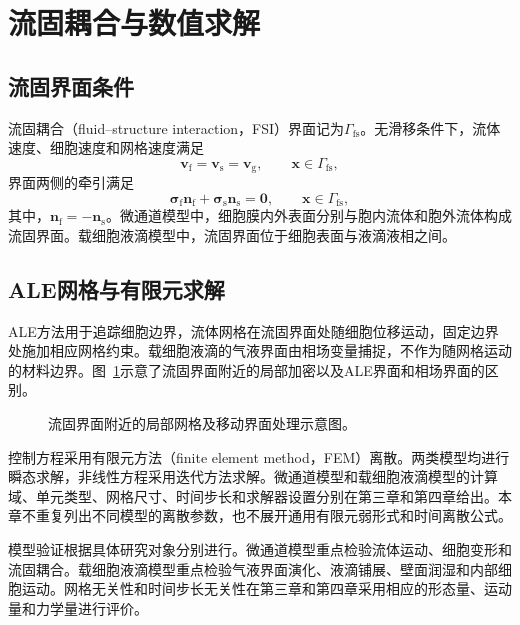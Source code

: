 \section{流固耦合与数值求解}

\subsection{流固界面条件}

流固耦合（fluid--structure interaction，FSI）界面记为$\Gamma_{\mathrm{fs}}$。无滑移条件下，流体速度、细胞速度和网格速度满足
\begin{equation}
\boldsymbol{v}_{\mathrm f}
=
\boldsymbol{v}_{\mathrm s}
=
\boldsymbol{v}_{\mathrm g},
\qquad
\boldsymbol{x}\in\Gamma_{\mathrm{fs}},
\label{eq:ch2_fsi_kinematic}
\end{equation}
界面两侧的牵引满足
\begin{equation}
\boldsymbol{\sigma}_{\mathrm f}\boldsymbol{n}_{\mathrm f}
+
\boldsymbol{\sigma}_{\mathrm s}\boldsymbol{n}_{\mathrm s}
=
\boldsymbol{0},
\qquad
\boldsymbol{x}\in\Gamma_{\mathrm{fs}},
\label{eq:ch2_fsi_dynamic}
\end{equation}
其中，$\boldsymbol{n}_{\mathrm f}=-\boldsymbol{n}_{\mathrm s}$。微通道模型中，细胞膜内外表面分别与胞内流体和胞外流体构成流固界面。载细胞液滴模型中，流固界面位于细胞表面与液滴液相之间\cite{hou2012numerical}。

\subsection{ALE网格与有限元求解}

ALE方法用于追踪细胞边界，流体网格在流固界面处随细胞位移运动，固定边界处施加相应网格约束。载细胞液滴的气液界面由相场变量捕捉，不作为随网格运动的材料边界。图~\ref{fig:ch2_ale_mesh}示意了流固界面附近的局部加密以及ALE界面和相场界面的区别。

\begin{figure}[htbp]
  \centering
  
  \caption{流固界面附近的局部网格及移动界面处理示意图。}
  \label{fig:ch2_ale_mesh}
\end{figure}

控制方程采用有限元方法（finite element method，FEM）离散。两类模型均进行瞬态求解，非线性方程采用迭代方法求解。微通道模型和载细胞液滴模型的计算域、单元类型、网格尺寸、时间步长和求解器设置分别在第三章和第四章给出。本章不重复列出不同模型的离散参数，也不展开通用有限元弱形式和时间离散公式。

模型验证根据具体研究对象分别进行。微通道模型重点检验流体运动、细胞变形和流固耦合。载细胞液滴模型重点检验气液界面演化、液滴铺展、壁面润湿和内部细胞运动。网格无关性和时间步长无关性在第三章和第四章采用相应的形态量、运动量和力学量进行评价。

